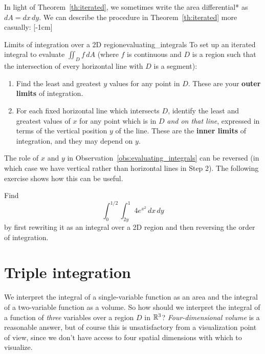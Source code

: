 \documentclass[svgnames]{watsonbook}
\begin{document}
In light of
Theorem~\ref{th:iterated}, we sometimes write the area differential*
as $dA = dx \, dy$. We can describe the procedure in
Theorem~\ref{th:iterated} more casually: [-1cm]
\begin{obs}{Limits of integration over a 2D
    region}{evaluating_integrals}
      To set up an iterated integral to evaluate $\iint_D f \, dA$ (where $f$ is continuous and $D$ is a
    region such that the intersection of every horizontal line with
    $D$ is a segment): 
  \begin{enumerate}
\item Find the least and greatest $y$ values for any point in
  $D$. These are your \textbf{outer limits} of integration. 
\item For each fixed horizontal line which intersects $D$, identify
  the least and greatest values of $x$ for any point which is in $D$
  \textit{and on that line}, expressed in terms of the vertical
  position $y$ of the line. These are the \textbf{inner limits} of
  integration, and they may depend on $y$.
\end{enumerate}
\end{obs}

The role of $x$ and $y$ in Observation~\ref{obs:evaluating_integrals} can
be reversed (in which case we have vertical rather than horizontal
lines in Step 2). The following exercise shows how this can be useful. 

\begin{exercise}{}{}
  Find
  \[
    \int_0^{1/2} \int_{2y}^1 4e^{x^2}\, dx\, dy
  \]
  by first rewriting it as an integral over a 2D
  region and then reversing the order of integration.
\end{exercise}


\section{Triple integration} \label{sec:triple} 


We interpret the integral of a single-variable function as an area and
the integral of a two-variable function as a volume. So how should we
interpret the integral of a function of \textit{three} variables over
a region $D$ in $\mathbb{R}^3$?  \textit{Four-dimensional volume} is a reasonable
answer, but of course this is unsatisfactory from a visualization
point of view, since we don't have access to four spatial dimensions
with which to visualize.
\end{document}
